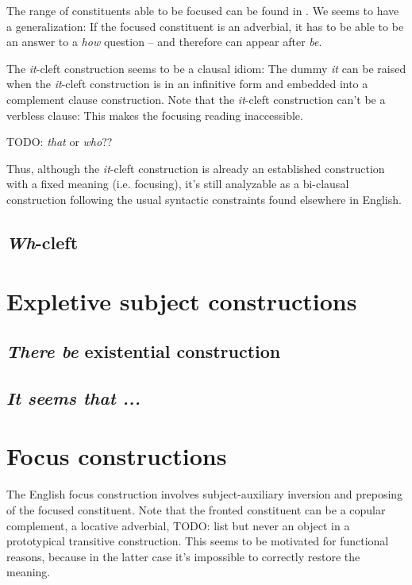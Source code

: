 \documentclass[UTF8, a4paper, oneside, scheme=plain, 12pt]{ctexbook}
\newcommand*{\citepages}[1]{pp.~{#1}}
\newcommand{\form}[1]{\emph{#1}}
\begin{document}
The range of constituents able to be focused 
can be found in \citet[\citepages{1417-1419}]{cgel}.
We seems to have a generalization: 
If the focused constituent is an adverbial, 
it has to be able to be an answer to a \form{how} question -- 
and therefore can appear after \form{be}.

The \form{it}-cleft construction seems to be a clausal idiom:
The dummy \form{it} can be raised
when the \form{it}-cleft construction is in an infinitive form 
and embedded into a complement clause construction.
Note that the \form{it}-cleft construction can't be a verbless clause: 
This makes the focusing reading inaccessible.

TODO: \form{that} or \form{who}?? 

Thus, although the \form{it}-cleft construction 
is already an established construction with a fixed meaning (i.e. focusing),
it's still analyzable as a bi-clausal construction
following the usual syntactic constraints found elsewhere in English.

\subsection{\form{Wh}-cleft}

\section{Expletive subject constructions}

\subsection{\form{There be} existential construction}

\begin{exe}
    \ex 
\end{exe}

\subsection{\form{It seems that ...}}

\section{Focus constructions}

The English focus construction involves subject-auxiliary inversion 
and preposing of the focused constituent.
Note that the fronted constituent can be a copular complement,
a locative adverbial, TODO: list 
but never an object in a prototypical transitive construction.
This seems to be motivated for functional reasons,
because in the latter case it's impossible to correctly restore the meaning.
\end{document}
